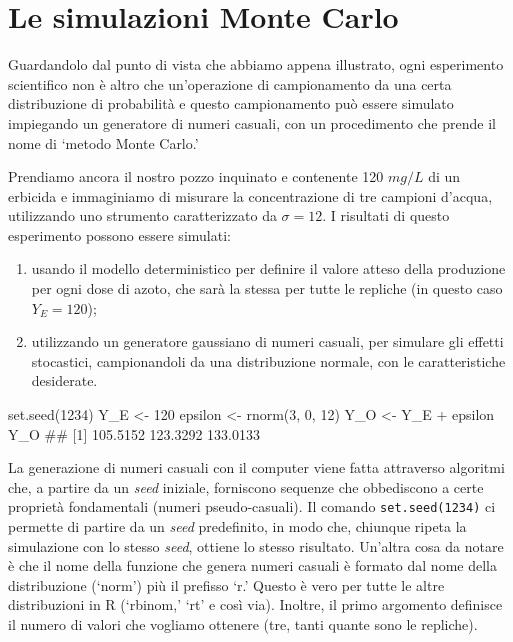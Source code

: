 \documentclass[a4paper,12pt,oneside]{book}
\providecommand{\tightlist}{%
  \setlength{\itemsep}{0pt}\setlength{\parskip}{0pt}}
\newenvironment{Shaded}{\begin{snugshade}}{\end{snugshade}}
\newcommand{\DecValTok}[1]{#1}
\newcommand{\SpecialCharTok}[1]{#1}
\newcommand{\DocumentationTok}[1]{#1}
\newcommand{\OtherTok}[1]{#1}
\newcommand{\FunctionTok}[1]{#1}
\newcommand{\NormalTok}[1]{#1}
\begin{document}
\hypertarget{le-simulazioni-monte-carlo}{%
\section{Le simulazioni Monte Carlo}\label{le-simulazioni-monte-carlo}}

Guardandolo dal punto di vista che abbiamo appena illustrato, ogni esperimento scientifico non è altro che un'operazione di campionamento da una certa distribuzione di probabilità e questo campionamento può essere simulato impiegando un generatore di numeri casuali, con un procedimento che prende il nome di `metodo Monte Carlo.'

Prendiamo ancora il nostro pozzo inquinato e contenente 120 \(mg/L\) di un erbicida e immaginiamo di misurare la concentrazione di tre campioni d'acqua, utilizzando uno strumento caratterizzato da \(\sigma = 12\). I risultati di questo esperimento possono essere simulati:

\begin{enumerate}
\def\labelenumi{\arabic{enumi}.}
\tightlist
\item
  usando il modello deterministico per definire il valore atteso della produzione per ogni dose di azoto, che sarà la stessa per tutte le repliche (in questo caso \(Y_E = 120\));
\item
  utilizzando un generatore gaussiano di numeri casuali, per simulare gli effetti stocastici, campionandoli da una distribuzione normale, con le caratteristiche desiderate.
\end{enumerate}

\begin{Shaded}
\begin{Highlighting}[]
\FunctionTok{set.seed}\NormalTok{(}\DecValTok{1234}\NormalTok{)}
\NormalTok{Y\_E }\OtherTok{\textless{}{-}} \DecValTok{120}
\NormalTok{epsilon }\OtherTok{\textless{}{-}} \FunctionTok{rnorm}\NormalTok{(}\DecValTok{3}\NormalTok{, }\DecValTok{0}\NormalTok{, }\DecValTok{12}\NormalTok{)}
\NormalTok{Y\_O }\OtherTok{\textless{}{-}}\NormalTok{ Y\_E }\SpecialCharTok{+}\NormalTok{ epsilon}
\NormalTok{Y\_O}
\DocumentationTok{\#\# [1] 105.5152 123.3292 133.0133}
\end{Highlighting}
\end{Shaded}

La generazione di numeri casuali con il computer viene fatta attraverso algoritmi che, a partire da un \emph{seed} iniziale, forniscono sequenze che obbediscono a certe proprietà fondamentali (numeri pseudo-casuali). Il comando \texttt{set.seed(1234)} ci permette di partire da un \emph{seed} predefinito, in modo che, chiunque ripeta la simulazione con lo stesso \emph{seed}, ottiene lo stesso risultato. Un'altra cosa da notare è che il nome della funzione che genera numeri casuali è formato dal nome della distribuzione (`norm') più il prefisso `r.' Questo è vero per tutte le altre distribuzioni in R (`rbinom,' `rt' e così via). Inoltre, il primo argomento definisce il numero di valori che vogliamo ottenere (tre, tanti quante sono le repliche).
\end{document}

